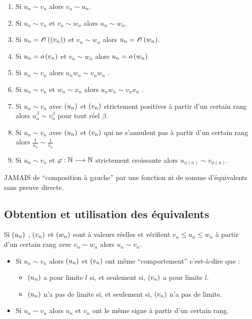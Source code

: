 \begin{defprop}
    \begin{enumerate}
        \item Si \(u_n \sim v_n\) alors \(v_n \sim u_n\).
        \item Si \(u_n \sim v_n\) et \(v_n \sim w_n\) alors \(u_n \sim w_n\).
        \item Si \(u_n = \mathscr{O}\left(\left(v_n\right)\right)\) et \(v_n \sim w_n\) alors \(u_n = \mathscr{O}\left(w_n\right)\).
        \item Si \(u_n = o\left(v_n\right)\) et \(v_n \sim w_n\) alors \(u_n = o\left(w_n\right)\)
        \item Si \(u_n \sim v_n\) alors \(u_nw_n \sim v_nw_n\) .
        \item Si \(u_n \sim v_n\) et \(w_n \sim x_n\) alors \(u_nw_n \sim v_nx_n\) .
        \item Si \(u_n \sim v_n\) avec \(\left(u_n\right)\) et \(\left(v_n\right)\) strictement positives à partir d’un certain rang alors \(u^{\beta}_n \sim v^{\beta}_n\) pour tout réel \(\beta\).
        \item Si \(u_n \sim v_n\) avec \(\left(u_n\right)\) et \(\left(v_n\right)\) qui ne s’annulent pas à partir d’un certain rang alors \(\frac{1}{u_n}\sim \frac{1}{v_n}\)
        \item Si \(u_n \sim v_n\) et \(\varphi : \mathbb{N} \longrightarrow \mathbb{N}\) strictement croissante alors \(u_{\phi(n)} \sim v_{\phi(n)}\).
    \end{enumerate}
    JAMAIS de “composition à gauche” par une fonction ni de somme d’équivalents sans preuve directe.
\end{defprop}

\subsection{Obtention et utilisation des équivalents}
\begin{defprop}

    Si \(\left(u_n\right)\) , \(\left(v_n\right)\) et \(\left(w_n\right)\) sont à valeurs réelles et vérifient \(v_n \leq u_n \leq w_n\) à partir d’un certain rang avec \(v_n \sim w_n\) alors \(u_n \sim v_n\).
\end{defprop}
\begin{defprop}
    \begin{itemize}
        \item Si \(u_n \sim v_n\) alors \(\left(u_n\right)\) et \(\left(v_n\right)\) ont même “comportement” c’est-à-dire que :
        \begin{itemize}
            \item \(\left(u_n\right)\) a pour limite \(l\) si, et seulement si, \(\left(v_n\right)\) a pour limite \(l\).
            \item \(\left(u_n\right)\) n’a pas de limite si, et seulement si, \(\left(v_n\right)\) n’a pas de limite.
        \end{itemize}
        \item Si \(u_n \sim v_n\) alors \(u_n\) et \(v_n\) ont le même signe à partir d’un certain rang.
    \end{itemize}
\end{defprop}

